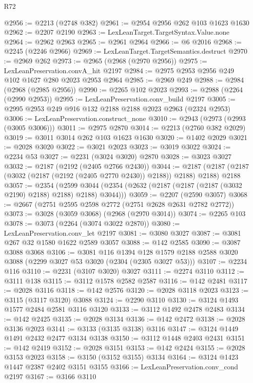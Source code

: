 \begin{lexlean}{R72}
\begin{coremodule}
@2956 := @2213 (@2748 @382)
@2961 := @2954 @2956 @262 @103 @1623 @1630
@2962 := @2207 @2190
@2963 := LexLeanTarget.TargetSyntax.Value.none
@2964 := @2962 @2963
@2965 := @2961 @2964
@2966 := @6 @2016
@2968 := @2245 (@2246 @2966)
@2969 := LexLeanTarget.TargetSemantics.destruct
@2970 := @2969 @262
@2973 := @2965 (@2968 (@2970 @2956))
@2975 := LexLeanPreservation.convA_hit @2197
@2984 := @2975 @2953 @2956 @249 @102 @1627 @280 @2023 @2953 @2964
@2985 := @2969 @249
@2988 := @2984 (@2968 (@2985 @2956))
@2990 := @2265 @102 @2023
@2993 := @2988 (@2264 (@2990 @2953))
@2995 := LexLeanPreservation.conv_build @2197
@3005 := @2995 @2953 @249 @916 @132 @2188 @2188 @2023 @2963 (@2324 @2953)
@3006 := LexLeanPreservation.construct_none
@3010 := @2943 (@2973 (@2993 (@3005 @3006)))
@3011 := @2975 @2870
@3014 := @2213 (@2760 @382 @2029)
@3019 := @3011 @3014 @262 @103 @1623 @1630
@3020 := @1402 @2029
@3021 := @2028 @3020
@3022 := @3021 @2023
@3023 := @3019 @3022
@3024 := @2234 @53
@3027 := @2231 (@3024 @3020) @2870
@3028 := @3023 @3027
@3032 := @2187 (@2192 (@2405 @2766 @2430))
@3044 := @2187 (@2187 (@2187 (@3032 (@2187 (@2192 (@2405 @2770 @2430)) @2188)) @2188) @2188) @2188
@3057 := @2354
    (@2599 @3044 (@2354 (@2632 (@2187 (@2187 (@2187 (@3032 @2190) @2188) @2188) @2188) @3044)))
@3059 := @2207 (@2590 @3057)
@3068 := @2667 (@2751 @2595 @2598 @2772 (@2751 @2628 @2631 @2782 @2772))
@3073 := @3028 (@3059 @3068) (@2968 (@2970 @3014))
@3074 := @2265 @103
@3078 := @3073 (@2264 (@3074 @3022 @2870))
@3080 := LexLeanPreservation.conv_let @2197
@3081 := @3080 @3027
@3087 := @3081 @267 @32 @1580 @1622 @2589 @3057
@3088 := @142 @2585
@3090 := @3087 @3088 @3068
@3106 := @3081
    @116
    @1394
    @128
    @1579
    @2188
    @2588
    @3020
    @3088
    (@2299 @3027 @53 @3020 (@2304 (@2305 @3027 @53)))
@3107 := @2234 @116
@3110 := @2231 (@3107 @3020) @3027
@3111 := @2274 @3110
@3112 := @3111 @138
@3115 := @3112 @1578 @2582 @2587
@3116 := @142 @2481
@3117 := @2028 @3116
@3118 := @142 @2576
@3120 := @2028 @3118 @2023
@3123 := @3115 (@3117 @3120) @3088
@3124 := @2290 @3110
@3130 := @3124 @1493 @1577 @2484 @2581 @3116 @3120
@3133 := @3112 @1492 @2478 @2483
@3134 := @142 @2425
@3135 := @2028 @3134
@3136 := @142 @2472
@3138 := @2028 @3136 @2023
@3141 := @3133 (@3135 @3138) @3116
@3147 := @3124 @1449 @1491 @2432 @2477 @3134 @3138
@3150 := @3112 @1448 @2403 @2431
@3151 := @142 @2419
@3152 := @2028 @3151
@3153 := @142 @2424
@3155 := @2028 @3153 @2023
@3158 := @3150 (@3152 @3155) @3134
@3164 := @3124 @1423 @1447 @2387 @2402 @3151 @3155
@3166 := LexLeanPreservation.conv_cond @2197
@3167 := @3166 @3110

\end{coremodule}
\end{lexlean}
